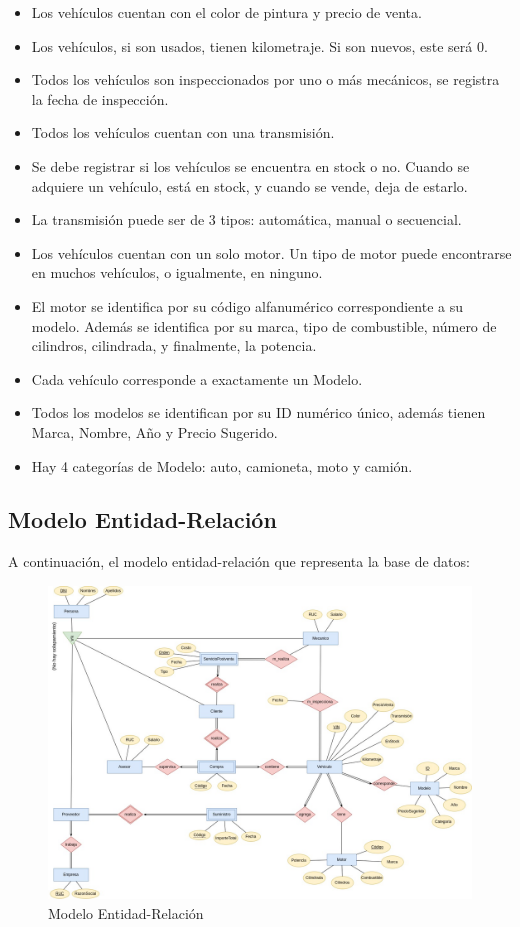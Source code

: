 \documentclass[12pt]{article}
\begin{document}
\begin{itemize}
\item Los vehículos cuentan con el color de pintura y precio de venta.
\item Los vehículos, si son usados, tienen kilometraje. Si son nuevos, este será 0.
\item Todos los vehículos son inspeccionados por uno o más mecánicos, se registra la fecha de inspección.
\item Todos los vehículos cuentan con una transmisión.
\item Se debe registrar si los vehículos se encuentra en stock o no. Cuando se adquiere un vehículo, está en stock, y cuando se vende, deja de estarlo.
\item La transmisión puede ser de 3 tipos: automática, manual o secuencial.
\item Los vehículos cuentan con un solo motor. Un tipo de motor puede encontrarse en muchos vehículos, o igualmente, en ninguno.
\item El motor se identifica por su código alfanumérico correspondiente a su modelo. Además se identifica por su marca, tipo de combustible, número de cilindros, cilindrada, y finalmente, la potencia.
\item Cada vehículo corresponde a exactamente un Modelo.
\item Todos los modelos se identifican por su ID numérico único, además tienen Marca, Nombre, Año y Precio Sugerido.
\item Hay 4 categorías de Modelo: auto, camioneta, moto y camión.
\end{itemize}

\subsection{Modelo Entidad-Relaci\'on}

A continuación, el modelo entidad-relación que representa la base de datos:

\begin{figure}
\centering
\includegraphics[width=1\textwidth]{ER.jpg}
\caption{Modelo Entidad-Relación}
\end{figure}
\end{document}
